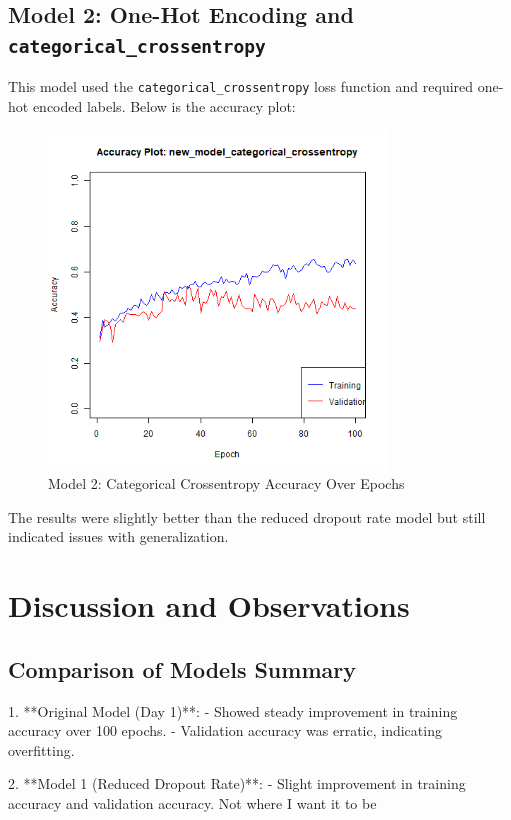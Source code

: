 \documentclass{article}
\begin{document}
\subsection*{Model 2: One-Hot Encoding and \texttt{categorical\_crossentropy}}
This model used the \texttt{categorical\_crossentropy} loss function and required one-hot encoded labels. Below is the accuracy plot:

\begin{figure}[h!]
    \centering
    \includegraphics[width=0.8\textwidth]{../results/new_model_categorical_crossentropy_accuracy_plot.png}
    \caption{Model 2: Categorical Crossentropy Accuracy Over Epochs}
\end{figure}

The results were slightly better than the reduced dropout rate model but still indicated issues with generalization.

\section*{Discussion and Observations}

\subsection*{Comparison of Models Summary}
1. **Original Model (Day 1)**:
   - Showed steady improvement in training accuracy over 100 epochs.
   - Validation accuracy was erratic, indicating overfitting.

2. **Model 1 (Reduced Dropout Rate)**:
   - Slight improvement in training accuracy and validation accuracy. Not where I want it to be
\end{document}

